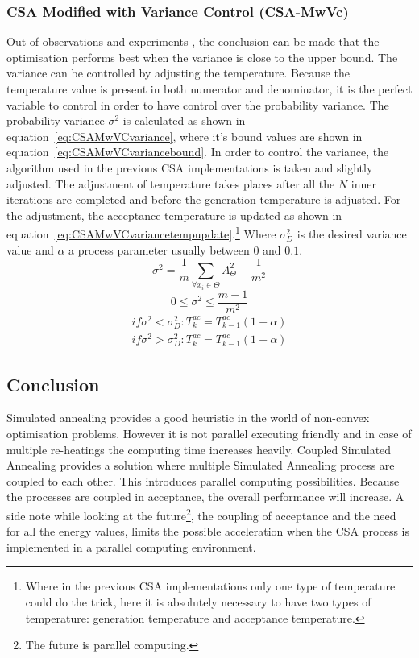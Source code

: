 \subsubsection{CSA Modified with Variance Control (CSA-MwVc)}
Out of observations and experiments \cite{csa2007}, the conclusion can be made that the optimisation performs best when the variance is close to the upper bound.
The variance can be controlled by adjusting the temperature. 
Because the temperature value is present in both numerator and denominator, it is the perfect variable to control in order to have control over the probability variance.
The probability variance $\sigma^2$ is calculated as shown in equation~\ref{eq:CSAMwVCvariance}, where it's bound values are shown in equation~\ref{eq:CSAMwVCvariancebound}.
In order to control the variance, the algorithm used in the previous CSA implementations is taken and slightly adjusted.
The adjustment of temperature takes places after all the $N$ inner iterations are completed and before the generation temperature is adjusted.
For the adjustment, the acceptance temperature is updated as shown in equation~\ref{eq:CSAMwVCvariancetempupdate}.\footnote{Where in the previous CSA implementations only one type of temperature could do the trick, here it is absolutely necessary to have two types of temperature: generation temperature and acceptance temperature.\cite{csa2007}}
Where $\sigma_D^2$ is the desired variance value and $\alpha$ a process parameter usually between $0$ and $0.1$.
\begin{equation}
	\sigma^2 = \frac{1}{m}\sum_{\forall x_i \in \Theta}^{} A_\Theta^2 - \frac{1}{m^2}
	\label{eq:CSAMwVCvariance}
\end{equation}
\begin{equation}
	0 \leq \sigma^2 \leq \frac{m - 1}{m^2}
	\label{eq:CSAMwVCvariancebound}
\end{equation}
\begin{equation}
	\begin{split}
		if  \sigma^2 < \sigma_D^2: T_k^{ac}=T_{k-1}^{ac}(1 - \alpha) \\
		if  \sigma^2 > \sigma_D^2: T_k^{ac}=T_{k-1}^{ac}(1 + \alpha)
	\end{split}
	\label{eq:CSAMwVCvariancetempupdate}
\end{equation}
 
\subsection{Conclusion}
Simulated annealing provides a good heuristic in the world of non-convex optimisation problems.
However it is not parallel executing friendly and in case of multiple re-heatings the computing time increases heavily. 
Coupled Simulated Annealing provides a solution where multiple Simulated Annealing process are coupled to each other. 
This introduces parallel computing possibilities.
Because the processes are coupled in acceptance, the overall performance will increase.
A side note while looking at the future\footnote{The future is parallel computing.}, the coupling of acceptance and the need for all the energy values, limits the possible acceleration when the CSA process is implemented in a parallel computing environment.

